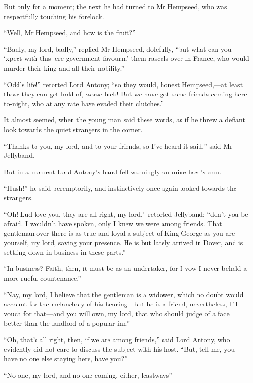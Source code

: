 But only for a moment; the next he had turned to Mr Hempseed, who was respectfully touching his forelock.

\enquote{Well, Mr Hempseed, and how is the fruit?}

\enquote{Badly, my lord, badly,} replied Mr Hempseed, dolefully, \enquote{but what can you `xpect with this `ere government favourin’ them rascals over in France, who would murder their king and all their nobility.}

\enquote{Odd's life!} retorted Lord Antony; \enquote{so they would, honest Hempseed,---at least those they can get hold of, worse luck! But we have got some friends coming here to-night, who at any rate have evaded their clutches.}

It almost seemed, when the young man said these words, as if he threw a defiant look towards the quiet strangers in the corner.

\enquote{Thanks to you, my lord, and to your friends, so I've heard it said,} said Mr Jellyband.

But in a moment Lord Antony's hand fell warningly on mine host's arm.

\enquote{Hush!} he said peremptorily, and instinctively once again looked towards the strangers.

\enquote{Oh! Lud love you, they are all right, my lord,} retorted Jellyband; \enquote{don't you be afraid. I wouldn't have spoken, only I knew we were among friends. That gentleman over there is as true and loyal a subject of King George as you are yourself, my lord, saving your presence. He is but lately arrived in Dover, and is settling down in business in these parts.}

\enquote{In business? Faith, then, it must be as an undertaker, for I vow I never beheld a more rueful countenance.}

\enquote{Nay, my lord, I believe that the gentleman is a widower, which no doubt would account for the melancholy of his bearing---but he is a friend, nevertheless, I'll vouch for that---and you will own, my lord, that who should judge of a face better than the landlord of a popular inn\longdash}

\enquote{Oh, that's all right, then, if we are among friends,} said Lord Antony, who evidently did not care to discuss the subject with his host. \enquote{But, tell me, you have no one else staying here, have you?}

\enquote{No one, my lord, and no one coming, either,  leastways\longdash}

